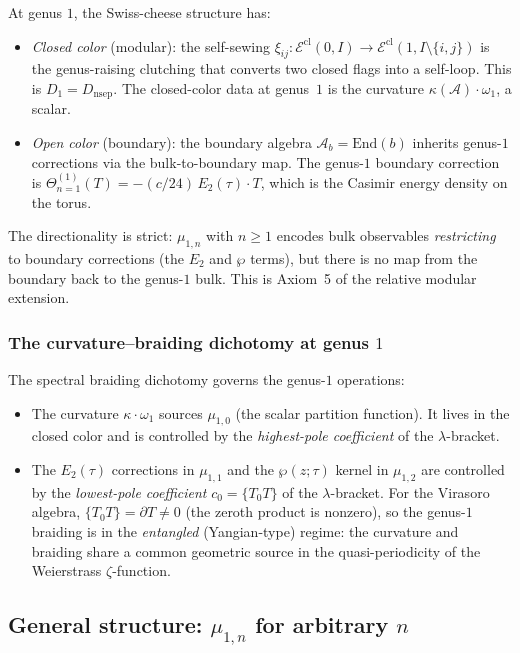 \documentclass[11pt]{article}
\newcommand{\cA}{\mathcal{A}}
\providecommand{\cE}{\mathcal{E}}
\begin{document}
At genus $1$, the Swiss-cheese structure has:
\begin{itemize}[leftmargin=1.8em]
\item \emph{Closed color} (modular): the self-sewing
  $\xi_{ij} \colon \cE^{\mathrm{cl}}(0,I) \to
  \cE^{\mathrm{cl}}(1, I \setminus \{i,j\})$
  is the genus-raising clutching that converts two closed flags
  into a self-loop.  This is $D_1 = D_{\mathrm{nsep}}$.
  The closed-color data at genus~$1$ is the curvature
  $\kappa(\cA) \cdot \omega_1$, a scalar.
\item \emph{Open color} (boundary): the boundary algebra
  $\cA_b = \mathrm{End}(b)$ inherits genus-$1$ corrections via
  the bulk-to-boundary map.  The genus-$1$ boundary correction is
  $\Theta^{(1)}_{n=1}(T) = -(c/24)\,E_2(\tau) \cdot T$, which
  is the Casimir energy density on the torus.
\end{itemize}

The directionality is strict: $\mu_{1,n}$ with $n \geq 1$ encodes
bulk observables \emph{restricting} to boundary corrections
(the $E_2$ and $\wp$ terms), but there is no map from the boundary
back to the genus-$1$ bulk.  This is Axiom~5 of the relative
modular extension.

\subsubsection{The curvature--braiding dichotomy at genus $1$}

The spectral braiding dichotomy governs the genus-$1$ operations:
\begin{itemize}[leftmargin=1.8em]
\item The curvature $\kappa \cdot \omega_1$ sources $\mu_{1,0}$
  (the scalar partition function).  It lives in the closed color
  and is controlled by the \emph{highest-pole coefficient}
  of the $\lambda$-bracket.
\item The $E_2(\tau)$ corrections in $\mu_{1,1}$ and the
  $\wp(z;\tau)$ kernel in $\mu_{1,2}$ are controlled by
  the \emph{lowest-pole coefficient} $c_0 = \{T {}_0 T\}$
  of the $\lambda$-bracket.  For the Virasoro algebra,
  $\{T {}_0 T\} = \partial T \neq 0$ (the zeroth product is
  nonzero), so the genus-$1$ braiding is in the
  \emph{entangled} (Yangian-type) regime: the curvature and
  braiding share a common geometric source in the
  quasi-periodicity of the Weierstrass $\zeta$-function.
\end{itemize}

\subsection{General structure: $\mu_{1,n}$ for arbitrary $n$}
\end{document}

